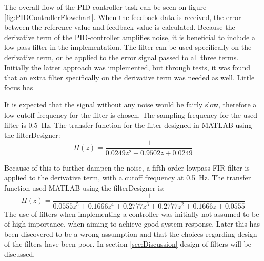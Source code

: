 \documentclass[../../main.tex]{subfiles}
\begin{document}
The overall flow of the PID-controller task can be seen on figure \ref{fig:PIDControllerFlowchart}. When the feedback data is received, the error between the reference value and feedback value is calculated. Because the derivative term of the PID-controller amplifies noise, it is beneficial to include a low pass filter in the implementation. The filter can be used specifically on the derivative term, or be applied to the error signal passed to all three terms. Initially the latter approach was implemented, but through tests, it was found that an extra filter specifically on the derivative term was needed as well. Little focus has 

It is expected that the signal without any noise would be fairly slow, therefore a low cutoff frequency for the filter is chosen. The sampling frequency for the used filter is \SI{0.5}{\hertz}.
The transfer function for the filter designed in MATLAB using the filterDesigner:
\begin{equation}
    H(z) = \frac{1}{0.0249z^2 + 0.9502z + 0.0249}
\end{equation}



Because of this to further dampen the noise, a fifth order lowpass FIR filter is applied to the derivative term, with a cutoff frequency at \SI{0.5}{\hertz}. The transfer function used MATLAB using the filterDesigner is:
\begin{equation}
    H(z) = \frac{1}{0.0555z^5 + 0.1666z^4 + 0.2777z^3 + 0.2777z^2 + 0.1666z + 0.0555}
\end{equation}
The use of filters when implementing a controller was initially not assumed to be of high importance, when aiming to achieve good system response. Later this has been discovered to be a wrong assumption and that the choices regarding design of the filters have been poor. In section \ref{sec:Discussion} design of filters will be discussed.



\end{document}
